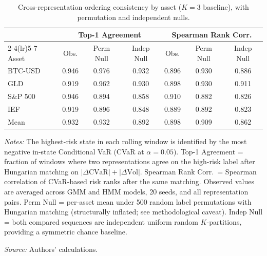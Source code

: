 \documentclass[preprint,12pt,authoryear]{elsarticle}
\begin{document}
\begin{table}[!htbp]
\centering
\small
\setlength{\tabcolsep}{4.5pt}
\caption{Cross-representation ordering consistency by asset ($K=3$ baseline), with permutation and independent nulls.}
\label{tab:ordering}
\begin{tabular}{lcccccc}
\toprule
 & \multicolumn{3}{c}{Top-1 Agreement} & \multicolumn{3}{c}{Spearman Rank Corr.} \\
\cmidrule(lr){2-4}\cmidrule(lr){5-7}
Asset & Obs. & Perm Null & Indep Null & Obs. & Perm Null & Indep Null \\
\midrule
BTC-USD  & 0.946 & 0.976 & 0.932 & 0.896 & 0.930 & 0.886 \\
GLD      & 0.919 & 0.962 & 0.930 & 0.898 & 0.930 & 0.911 \\
S\&P 500 & 0.946 & 0.894 & 0.858 & 0.910 & 0.882 & 0.826 \\
IEF      & 0.919 & 0.896 & 0.848 & 0.889 & 0.892 & 0.823 \\
\midrule
Mean     & 0.932 & 0.932 & 0.892 & 0.898 & 0.909 & 0.862 \\
\bottomrule
\end{tabular}
\par\medskip
\begin{minipage}{\linewidth}
\footnotesize
\textit{Notes:} The highest-risk state in each rolling window is identified by the most negative in-state Conditional VaR (CVaR at $\alpha = 0.05$). Top-1 Agreement = fraction of windows where two representations agree on the high-risk label after Hungarian matching on $|\Delta\mathrm{CVaR}|+|\Delta\mathrm{Vol}|$. Spearman Rank Corr.\ = Spearman correlation of CVaR-based risk ranks after the same matching. Observed values are averaged across GMM and HMM models, 20 seeds, and all representation pairs. Perm Null = per-asset mean under 500 random label permutations with Hungarian matching (structurally inflated; see methodological caveat). Indep Null = both compared sequences are independent uniform random $K$-partitions, providing a symmetric chance baseline.

\textit{Source:} Authors' calculations.
\end{minipage}
\end{table}
\end{document}
